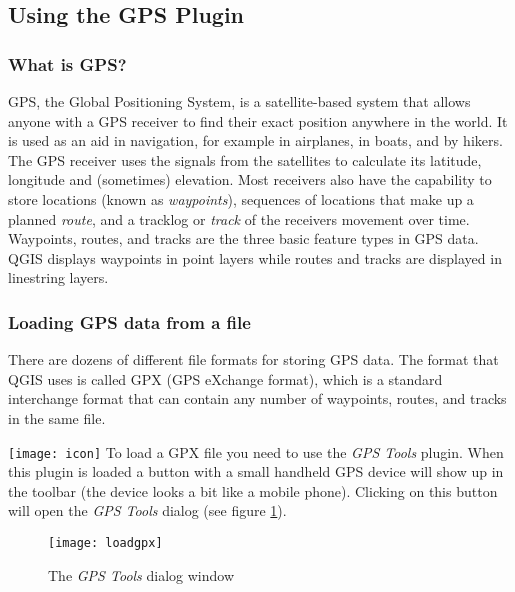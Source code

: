 \subsection{Using the GPS Plugin}\label{label_plugingps}

\subsubsection{What is GPS?}\label{whatsgps}

GPS, the Global Positioning System, is a satellite-based system that
allows anyone with a GPS receiver to find their exact position anywhere
in the world. It is used as an aid in navigation, for example in airplanes,
in boats, and by hikers. The GPS receiver uses the signals from the
satellites to calculate its latitude, longitude and (sometimes) elevation.
Most receivers also have the capability to store locations (known
as \emph{waypoints}), sequences of locations that make up a planned
\emph{route}, and a tracklog or \emph{track} of the receivers movement
over time. Waypoints, routes, and tracks are the three basic feature
types in GPS data. QGIS displays waypoints in point layers while routes
and tracks are displayed in linestring layers.

\subsubsection{Loading GPS data from a file}\label{label_loadgps}

There are dozens of different file formats for storing GPS data. The
format that QGIS uses is called GPX (GPS eXchange format), which is
a standard interchange format that can contain any number of waypoints,
routes, and tracks in the same file.

\texttt{[image: icon]} To load a GPX file you need to use the
\emph{GPS
Tools} plugin. When this plugin is loaded a button with a small handheld GPS
device will show up in the toolbar (the device looks a bit like a mobile
phone). Clicking on this button will open the \emph{GPS Tools} dialog (see
figure \ref{figure GPX loader}).

\begin{figure}[ht]
   \begin{center}
\caption{\label{figure GPX loader}The \emph{GPS Tools} dialog window}
\texttt{[image: loadgpx]}
\end{center}
\end{figure}

